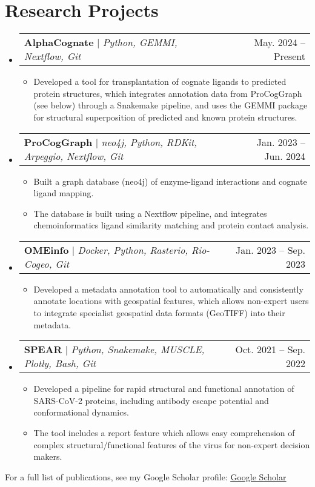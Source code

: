 \documentclass[a4paper,11pt]{article}
\makeatletter
\newcommand{\resumeItem}[1]{
  \item\small{
    {#1 \vspace{-2pt}}
  }
}
\newcommand{\resumeProjectHeading}[2]{
    \item
    \begin{tabular*}{0.97\textwidth}{l@{\extracolsep{\fill}}r}
      \small#1 & #2 \\
    \end{tabular*}\vspace{-7pt}
}
\newcommand{\resumeSubHeadingListStart}{\begin{itemize}[leftmargin=0.15in, label={}]}
\newcommand{\resumeSubHeadingListEnd}{\end{itemize}}
\newcommand{\resumeItemListStart}{\begin{itemize}}
\newcommand{\resumeItemListEnd}{\end{itemize}\vspace{-5pt}}
\makeatother
\begin{document}
\section{Research Projects}
    \resumeSubHeadingListStart
      \resumeProjectHeading
        {\textbf{AlphaCognate} $|$ \emph{Python, GEMMI, Nextflow, Git}}{May. 2024 -- Present}
        \resumeItemListStart
          \resumeItem{Developed a tool for transplantation of cognate ligands to predicted protein structures, which integrates annotation data from ProCogGraph (see below) through a Snakemake pipeline, and uses the GEMMI package for structural superposition of predicted and known protein structures.}
        \resumeItemListEnd
      \resumeProjectHeading
          {\textbf{ProCogGraph} $|$ \emph{neo4j, Python, RDKit, Arpeggio, Nextflow, Git}}{Jan. 2023 -- Jun. 2024}
          \resumeItemListStart
            \resumeItem{Built a graph database (neo4j) of enzyme-ligand interactions and cognate ligand mapping.}
            \resumeItem{The database is built using a Nextflow pipeline, and integrates chemoinformatics ligand similarity matching and protein contact analysis.}
          \resumeItemListEnd
      \resumeProjectHeading
          {\textbf{OMEinfo} $|$ \emph{Docker, Python, Rasterio, Rio-Cogeo, Git}}{Jan. 2023 -- Sep. 2023}
          \resumeItemListStart
            \resumeItem{Developed a metadata annotation tool to automatically and consistently annotate locations with geospatial features, which allows non-expert users to integrate specialist geospatial data formats (GeoTIFF) into their metadata.}
          \resumeItemListEnd
      \resumeProjectHeading
          {\textbf{SPEAR} $|$ \emph{Python, Snakemake, MUSCLE, Plotly, Bash, Git}}{Oct. 2021 -- Sep. 2022}
          \resumeItemListStart
            \resumeItem{Developed a pipeline for rapid structural and functional annotation of SARS-CoV-2 proteins, including antibody escape potential and conformational dynamics.}
            \resumeItem{The tool includes a report feature which allows easy comprehension of complex structural/functional features of the virus for non-expert decision makers.}
          \resumeItemListEnd
    \resumeSubHeadingListEnd
For a full list of publications, see my Google Scholar profile: \href{https://scholar.google.com/citations?user=b8OKEYcAAAAJ&hl=en&oi=ao}{\underline{Google Scholar}}


%
\end{document}
